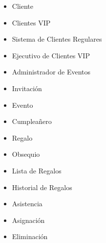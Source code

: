 \begin{itemize}
	\item Cliente
	\item Clientes VIP
	\item Sistema de Clientes Regulares
	\item Ejecutivo de Clientes VIP
	\item Administrador de Eventos
	\item Invitaci\'on
	\item Evento
	\item Cumplea\~nero
	\item Regalo
	\item Obsequio
	\item Lista de Regalos
	\item Historial de Regalos
	\item Asistencia
	\item Asignaci\'on
	\item Eliminaci\'on
\end{itemize}
